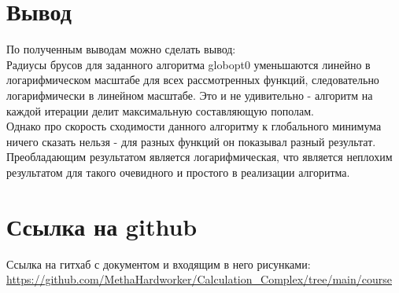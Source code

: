 \documentclass[a4paper]{article}
\begin{document}
\section{Вывод}
По полученным выводам можно сделать вывод:\\
Радиусы брусов для заданного алгоритма globopt0 уменьшаются линейно в логарифмическом масштабе для всех рассмотренных функций, следовательно логарифмически в линейном масштабе. Это и не удивительно - алгоритм на каждой итерации делит максимальную составляющую пополам.\\
Однако про скорость сходимости данного алгоритму к глобального минимума ничего сказать нельзя - для разных функций он показывал разный результат. Преобладающим результатом является логарифмическая, что является неплохим результатом для такого очевидного и простого в реализации алгоритма. 
\section{Ссылка на github}
Ссылка на гитхаб с документом и входящим в него рисунками:\\
\url{https://github.com/MethaHardworker/Calculation_Complex/tree/main/course}
\end{document}
